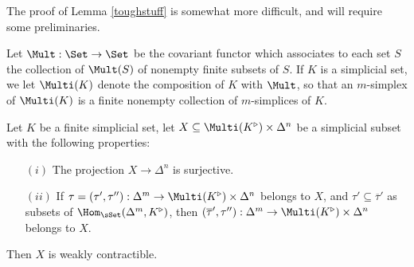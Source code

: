 The proof of Lemma \ref{toughstuff} is somewhat more difficult, and will require some preliminaries.

\begin{notation}
Let $\Mult: \Set \rightarrow \Set$ be the covariant functor which associates to each set
$S$ the collection of $\Mult(S)$ of nonempty finite subsets of $S$. If $K$ is a simplicial set, we let
$\Multi(K)$ denote the composition of $K$ with $\Mult$, so that an $m$-simplex of $\Multi(K)$ is
a finite nonempty collection of $m$-simplices of $K$.
\end{notation}

\begin{lemma}\label{stuffem}
Let $K$ be a finite simplicial set, let $X \subseteq \Multi(K^{\triangleright}) \times \Delta^n$ be a simplicial subset with the following properties:
\begin{itemize}
\item[$(i)$] The projection $X \rightarrow \Delta^n$ is surjective. 
\item[$(ii)$] If $\tau = (\tau', \tau''): \Delta^m \rightarrow \Multi(K^{\triangleright}) \times \Delta^n$ belongs to $X$, and $\tau' \subseteq \overline{\tau}'$ as subsets of $\Hom_{\sSet}( \Delta^m, K^{\triangleright})$, then $(\overline{\tau}',\tau''): \Delta^m \rightarrow \Multi(K^{\triangleright}) \times \Delta^n$ belongs to $X$.
\end{itemize}
Then $X$ is weakly contractible.
\end{lemma}

